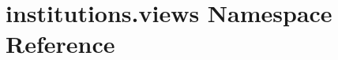 \hypertarget{namespaceinstitutions_1_1views}{\section{institutions.\-views Namespace Reference}
\label{namespaceinstitutions_1_1views}
}
